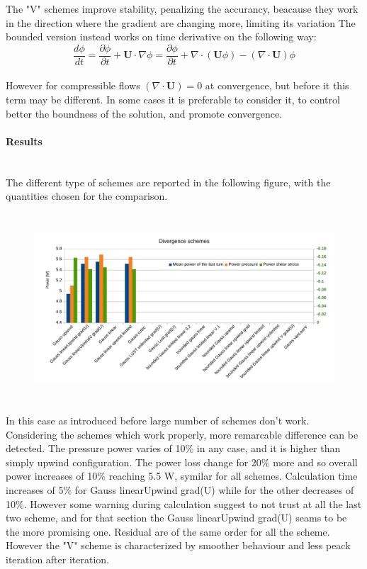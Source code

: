 \documentclass[a4paper,12pt]{article}
\begin{document}
The "V" schemes improve stability, penalizing the accurancy, beacause they work in the direction where the gradient are changing more, limiting its variation
The bounded version instead works on time derivative on the following way:
\begin{equation}
\frac{d \phi}{dt} = \frac{\partial \phi}{\partial t} + \bm{U} \cdot \nabla \phi = \frac{\partial \phi}{\partial t} + \nabla \cdot (\bm{U} \phi) - ( \nabla \cdot \bm{U} ) \phi
\end{equation}
\\ However for compressible flows $( \nabla \cdot \bm{U} ) = 0 $ at convergence, but before it this term may be different. In some cases it is preferable to consider it, to control better the boundness of the solution, and promote convergence.


\paragraph{Results} \mbox{}\\
The different type of schemes are reported in the following figure, with the quantities chosen for the comparison. 
\begin{figure}[H]
\centering
\includegraphics[height=7cm]{images/schemes/divschems-results.pdf}
\end{figure}
In this case as introduced before large number of schemes don't work. Considering the schemes which work properly, more remarcable difference can be detected.
The pressure power varies of 10\% in any case, and it is higher than simply upwind configuration. The power loss change for 20\% more and so overall power increases of 10\% reaching 5.5 W, symilar for all schemes. Calculation time increases of 5\% for Gauss linearUpwind grad(U) while for the other decreases of 10\%. However some warning during calculation suggest to not trust at all the last two scheme, and for that section the Gauss linearUpwind grad(U) seams to be the more promising one. Residual are of the same order for all the scheme. However the "V" scheme is characterized by smoother behaviour and less peack iteration after iteration. %
\end{document}
